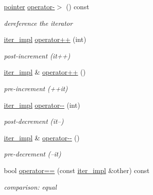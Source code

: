 \begin{DoxyCompactItemize}
\hyperlink{classnlohmann_1_1basic__json_1_1iter__impl_a3b56ff21ecdde2dc147288ee64cff0fd}{pointer} \hyperlink{classnlohmann_1_1basic__json_1_1iter__impl_a4b88de974b0690060a0f2c75a90464a6}{operator-\/$>$} () const 
\begin{DoxyCompactList}\small\item\em dereference the iterator \end{DoxyCompactList}\item 
\hyperlink{classnlohmann_1_1basic__json_1_1iter__impl}{iter\+\_\+impl} \hyperlink{classnlohmann_1_1basic__json_1_1iter__impl_ad26f18c771e02fd06468718d354330e9}{operator++} (int)
\begin{DoxyCompactList}\small\item\em post-\/increment (it++) \end{DoxyCompactList}\item 
\hyperlink{classnlohmann_1_1basic__json_1_1iter__impl}{iter\+\_\+impl} \& \hyperlink{classnlohmann_1_1basic__json_1_1iter__impl_a009c10355de23cffc4d07fe23eecdae3}{operator++} ()
\begin{DoxyCompactList}\small\item\em pre-\/increment (++it) \end{DoxyCompactList}\item 
\hyperlink{classnlohmann_1_1basic__json_1_1iter__impl}{iter\+\_\+impl} \hyperlink{classnlohmann_1_1basic__json_1_1iter__impl_a331271c9b79627e6fd8ed3f4e0d9fe94}{operator-\/-\/} (int)
\begin{DoxyCompactList}\small\item\em post-\/decrement (it--) \end{DoxyCompactList}\item 
\hyperlink{classnlohmann_1_1basic__json_1_1iter__impl}{iter\+\_\+impl} \& \hyperlink{classnlohmann_1_1basic__json_1_1iter__impl_a102fee51ae32056c2df59397d13d82b6}{operator-\/-\/} ()
\begin{DoxyCompactList}\small\item\em pre-\/decrement (--it) \end{DoxyCompactList}\item 
bool \hyperlink{classnlohmann_1_1basic__json_1_1iter__impl_a31af64cca4f8b1469303bc52ff4678f4}{operator==} (const \hyperlink{classnlohmann_1_1basic__json_1_1iter__impl}{iter\+\_\+impl} \&other) const 
\begin{DoxyCompactList}\small\item\em comparison\+: equal \end{DoxyCompactList}\item 

\end{DoxyCompactItemize}
